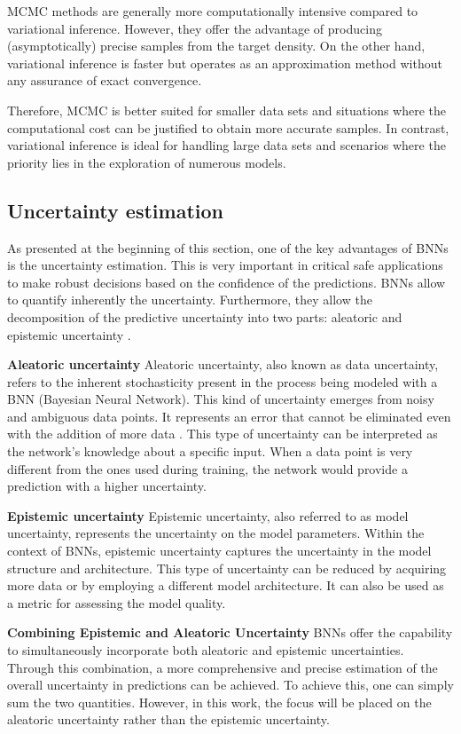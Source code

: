 MCMC methods are generally more computationally intensive compared to variational inference. However, they offer the advantage of producing (asymptotically) precise samples from the target density. On the other hand, variational inference is faster but operates as an approximation method without any assurance of exact convergence.

Therefore, MCMC is better suited for smaller data sets and situations where the computational cost can be justified to obtain more accurate samples. In contrast, variational inference is ideal for handling large data sets and scenarios where the priority lies in the exploration of numerous models.

\subsection{Uncertainty estimation}

As presented at the beginning of this section, one of the key advantages of BNNs is the uncertainty estimation. This is very important in critical safe applications to make robust decisions based on the confidence of the predictions. BNNs allow to quantify inherently the uncertainty. Furthermore, they allow the decomposition of the predictive uncertainty into two parts: aleatoric and epistemic uncertainty \cite{Mitros2019OnTV}.

\vspace{0.2cm}
\textbf{Aleatoric uncertainty}
Aleatoric uncertainty, also known as data uncertainty, refers to the inherent stochasticity present in the process being modeled with a BNN (Bayesian Neural Network). This kind of uncertainty emerges from noisy and ambiguous data points. It represents an error that cannot be eliminated even with the addition of more data \cite{article01}. This type of uncertainty can be interpreted as the network's knowledge about a specific input. When a data point is very different from the ones used during training, the network would provide a prediction with a higher uncertainty.

\vspace{0.2cm}
\textbf{Epistemic uncertainty}
Epistemic uncertainty, also referred to as model uncertainty, represents the uncertainty on the model parameters. Within the context of BNNs, epistemic uncertainty captures the uncertainty in the model structure and architecture. This type of uncertainty can be reduced by acquiring more data or by employing a different model architecture. It can also be used as a metric for assessing the model quality.

\vspace{0.2cm}
\textbf{Combining Epistemic and Aleatoric Uncertainty}
BNNs offer the capability to simultaneously incorporate both aleatoric and epistemic uncertainties. Through this combination, a more comprehensive and precise estimation of the overall uncertainty in predictions can be achieved. To achieve this, one can simply sum the two quantities. However, in this work, the focus will be placed on the aleatoric uncertainty rather than the epistemic uncertainty.